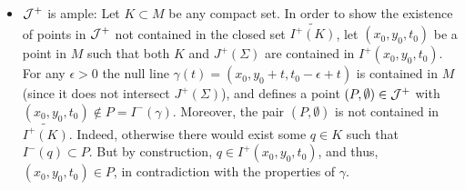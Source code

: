 \begin{itemize}
\item ${\cal J}^+$ is ample: Let $K\subset M$ be any compact set. In order to show the existence of points in ${\cal J}^+$ not contained in the closed set $\widetilde{I^+(K)}$, let $(x_0,y_0,t_0)$ be a point in $M$ such that both $K$ and $J^+(\Sigma)$ are contained in $I^+(x_0,y_0,t_0)$. For any $\epsilon>0$ the null line $\gamma(t)=(x_0,y_0+t,t_0-\epsilon+t)$ is contained in $M$ (since it does not intersect $J^+(\Sigma)$), and defines a point $(P,\emptyset)\in {\cal J}^+$ with $(x_0,y_0,t_{0})\not \in P=I^-(\gamma)$. Moreover, the pair $(P,\emptyset)$ is not contained in $\widetilde{I^{+}(K)}$. Indeed, otherwise there would exist
some $q\in K$ such that $I^{-}(q)\subset P$. But by construction,
$q\in I^{+}(x_0,y_0,t_{0})$, and thus, $(x_0,y_0,t_{0})\in P$, in contradiction with the properties of $\gamma$.




\end{itemize}
